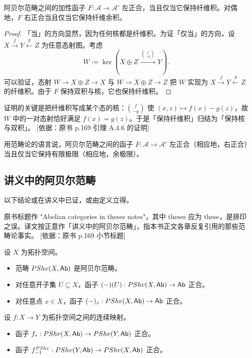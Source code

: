 \begin{lemma}\label{lem:A.4.6}
阿贝尔范畴之间的加性函子 $F:\mathcal{A}\to\mathcal{A}'$ 左正合，当且仅当它保持纤维积。对偶地，$F$ 右正合当且仅当它保持纤维余积。
\end{lemma}

\begin{proof}
「当」的方向显然，因为任何核都是纤维积。为证「仅当」的方向，设 $X\xrightarrow{f}Y\xleftarrow{g}Z$ 为任意态射图。考虑
\[
W:=\ker\left(X\oplus Z\xrightarrow{\ \binom{f}{-g}\ }Y\right).
\]
可以验证，态射 $W\to X\oplus Z\to X$ 与 $W\to X\oplus Z\to Z$ 把 $W$ 实现为 $X\xrightarrow{f}Y\xleftarrow{g}Z$ 的纤维积。由于 $F$ 保持双积与核，它也保持纤维积。
\end{proof}

\begin{yizhu}
证明的关键是把纤维积写成某个态的核：$\binom{f}{-g}$ 使 $(x,z)\mapsto f(x)-g(z)$，故 $W$ 中的一对态射恰好满足 $f(x)=g(z)$。于是「保持纤维积」归结为「保持核与双积」。
[依据：原书 p.169 引理 A.4.6 的证明]
\end{yizhu}

\begin{remark}\label{rem:A.4.7}
用范畴论的语言说，阿贝尔范畴之间的函子 $F:\mathcal{A}\to\mathcal{A}'$ 左正合（相应地，右正合）当且仅当它保持有限极限（相应地，余极限）。
\end{remark}

\subsection{讲义中的阿贝尔范畴}\label{sec:A.5}

以下结论或在讲义中已证，或由定义立得。

\begin{yizhu}
原书标题作 "Abelian categories in theses notes"，其中 theses 应为 these，是排印之误。译文按正意作「讲义中的阿贝尔范畴」，指本书正文各章反复引用的那些范畴论事实。
[依据：原书 p.169 小节标题]
\end{yizhu}

\begin{proposition}\label{prop:A.5.1}
设 $X$ 为拓扑空间。
\begin{itemize}[leftmargin=2em,itemsep=0.25ex]
  \item 范畴 $PShv(X,\mathsf{Ab})$ 是阿贝尔范畴。
  \item 对任意开子集 $U\subseteq X$，函子 $(-)(U):PShv(X,\mathsf{Ab})\to\mathsf{Ab}$ 正合。
  \item 对任意点 $x\in X$，函子 $(-)_x:PShv(X,\mathsf{Ab})\to\mathsf{Ab}$ 正合。
\end{itemize}
设 $f:X\to Y$ 为拓扑空间之间的连续映射。
\begin{itemize}[leftmargin=2em,itemsep=0.25ex]
  \item 函子 $f_*:PShv(X,\mathsf{Ab})\to PShv(Y,\mathsf{Ab})$ 正合。
  \item 函子 $f^{PShv}_{-1}:PShv(Y,\mathsf{Ab})\to PShv(X,\mathsf{Ab})$ 正合。
\end{itemize}
\end{proposition}


